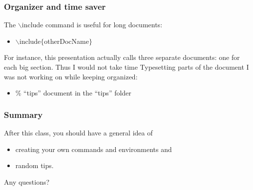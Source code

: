 \documentclass[slidestop,compress,mathserif]{beamer}
\begin{document}
\begin{frame}  \frametitle{Organizer and time saver}
The {\color{command}$\backslash$include} command is useful for long documents:
\vspace{1mm} \\
\begin{itemize}
\item[] {\color{command}$\backslash$include}{\color{braces}$\{${\color{black}otherDocName}$\}$}
\end{itemize}
\vspace{1mm}
For instance, this presentation actually calls three separate documents: one for each big section. Thus I would not take time Typesetting parts of the document I was not working on while keeping organized:
\vspace{1mm} \\
\begin{itemize}
\item[]  {\color{red}\% ``tips'' document in the ``tips'' folder}
\end{itemize}
\end{frame}

\begin{frame}  \frametitle{Summary}
After this class, you should have a general idea of
\vspace{1mm} \\
	\begin{itemize}
		\item creating your own commands and environments and 
		\item random tips.
	\end{itemize}
\vspace{1mm}
Any questions?
\end{frame}
\end{document}
